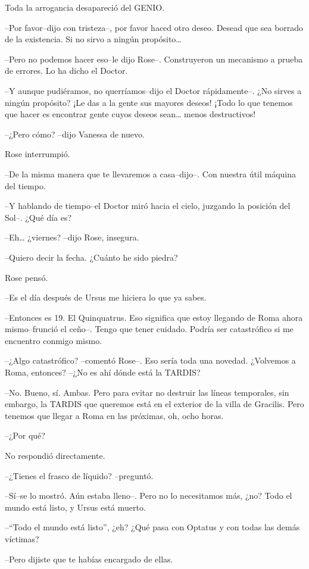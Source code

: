 Toda la arrogancia desapareció del GENIO.

--Por favor--dijo con tristeza--, por favor haced otro deseo. Desead que
sea borrado de la existencia. Si no sirvo a ningún propósito\ldots{}

--Pero no podemos hacer eso--le dijo Rose--. Construyeron un mecanismo a
prueba de errores. Lo ha dicho el Doctor.

--Y aunque pudiéramos, no querríamos--dijo el Doctor rápidamente--. ¿No
sirves a ningún propósito? ¡Le das a la gente sus mayores deseos! ¡Todo
lo que tenemos que hacer es encontrar gente cuyos deseos sean\ldots{}
menos destructivos!

--¿Pero cómo? --dijo Vanessa de nuevo.

Rose interrumpió.

--De la misma manera que te llevaremos a casa--dijo--. Con nuestra útil
máquina del tiempo.

--Y hablando de tiempo--el Doctor miró hacia el cielo, juzgando la
posición del Sol--. ¿Qué día es?

--Eh\ldots{} ¿viernes? --dijo Rose, insegura.

--Quiero decir la fecha. ¿Cuánto he sido piedra?

Rose pensó.

--Es el día después de Ursus me hiciera lo que ya sabes.

--Entonces es 19. El Quinquatrus. Eso significa que estoy llegando de
Roma ahora mismo--frunció el ceño--. Tengo que tener cuidado. Podría ser
catastrófico si me encuentro conmigo mismo.

--¿Algo catastrófico? --comentó Rose--. Eso sería toda una novedad.
¿Volvemos a Roma, entonces? --¿No es ahí dónde está la TARDIS?

--No. Bueno, sí. Ambas. Pero para evitar no destruir las líneas
temporales, sin embargo, la TARDIS que queremos está en el exterior de
la villa de Gracilis. Pero tenemos que llegar a Roma en las próximas,
oh, ocho horas.

--¿Por qué?

No respondió directamente.

--¿Tienes el frasco de líquido? --preguntó.

--Sí--se lo mostró. Aún estaba lleno--. Pero no lo necesitamos más, ¿no?
Todo el mundo está listo, y Ursus está muerto.

--``Todo el mundo está listo'', ¿eh? ¿Qué pasa con Optatus y con todas
las demás víctimas?

--Pero dijiste que te habías encargado de ellas.

